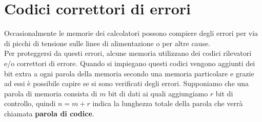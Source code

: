\documentclass[12pt]{report}
\begin{document}
\section{Codici correttori di errori}
Occasionalmente le memorie dei calcolatori possono compiere degli errori per via di picchi di tensione sulle linee di alimentazione o per altre cause. \\
Per proteggersi da questi errori, alcune memoria utilizzano dei codici rilevatori e/o correttori di errore. Quando si impiegano questi codici vengono aggiunti dei bit extra a ogni parola della memoria secondo una memoria particolare e grazie ad essi è possibile capire se si sono verificati degli errori.
Supponiamo che una parola di memoria consista di $m$ bit di dati ai quali aggiungiamo $r$ bit di controllo, quindi $n = m + r$ indica la lunghezza totale della parola che verrà chiamata \textbf{parola di codice}.
\end{document}
